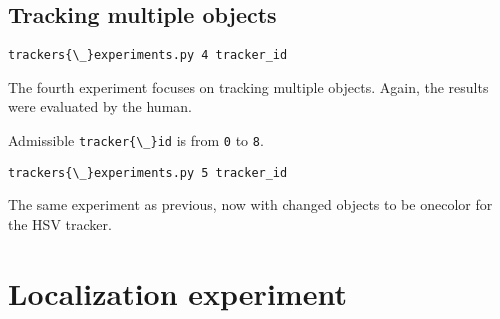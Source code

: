 \subsection*{Tracking multiple objects}

\verb+trackers{\_}experiments.py 4 tracker_id+

The fourth experiment focuses on tracking multiple objects. Again, the results were
evaluated by the human. 

Admissible \verb+tracker{\_}id+ is from \verb+0+ to \verb+8+.

\verb+trackers{\_}experiments.py 5 tracker_id+

The same experiment as previous, now with changed objects to be onecolor for
the HSV tracker.


\section{Localization experiment}
